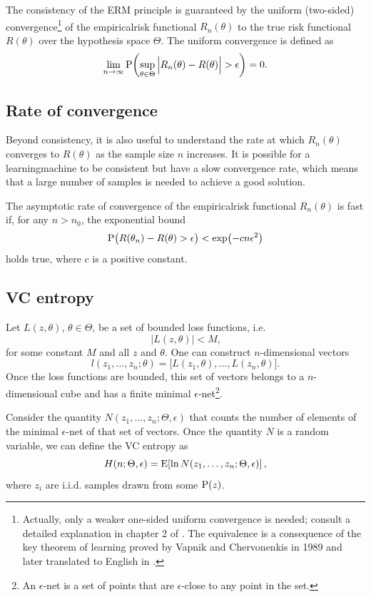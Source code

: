 The consistency of the ERM principle is guaranteed by the uniform (two-sided)
convergence\footnote{Actually, only a weaker one-sided uniform convergence is needed; consult a
detailed explanation in chapter 2 of .  The equivalence is a
consequence of the key theorem of learning proved by Vapnik and Chervonenkis in 1989 and
later translated to English in .} of the \gls{empiricalrisk} functional
$R_n(\theta)$ to the true risk functional $R(\theta)$ over the hypothesis space $\Theta$.
The uniform convergence is defined as
\[
  \lim_{n \to \infty} \operatorname{P}\!\left(
    \sup_{\theta \in \Theta} \Big| R_n(\theta) - R(\theta) \Big| > \epsilon
  \right) = 0\text{.}
\]

\subsection{Rate of convergence}

Beyond consistency, it is also useful to understand the rate at which $R_n(\theta)$
converges to $R(\theta)$ as the sample size $n$ increases.  It is possible for a \gls{learningmachine}
to be consistent but have a slow convergence rate, which means that a large number of
samples is needed to achieve a good solution.

The asymptotic rate of convergence of the \gls{empiricalrisk} functional $R_n(\theta)$ is
fast if, for any $n > n_0$, the exponential bound
\[
  \operatorname{P}\!\big(R(\theta_n) - R(\theta) > \epsilon\big) < \exp\!\left( - c n \epsilon^2 \right)
\]
holds true, where $c$ is a positive constant.

\subsection{VC entropy}

Let $L(z, \theta)$, $\theta \in \Theta$, be a set of bounded \gls{loss} functions, i.e.
\[
  \left| L(z, \theta) \right| < M\text{,}
\]
for some constant $M$ and all $z$ and $\theta$.  One can construct $n$-dimensional vectors
\[
  l(z_1, \dots, z_n; \theta) = \big[ L(z_1, \theta), \dots, L(z_n, \theta) \big]\text{.}
\]
Once the \gls{loss} functions are bounded, this set of vectors belongs to a $n$-dimensional
cube and has a finite minimal $\epsilon$-net\footnote{An $\epsilon$-net is a set of points
that are $\epsilon$-close to any point in the set.}.

Consider the quantity $N(z_1, \dots, z_n; \Theta, \epsilon)$ that counts the number of
elements of the minimal $\epsilon$-net of that set of vectors.
Once the quantity $N$ is a random variable, we can define the VC entropy as
\[
  H(n; \Theta, \epsilon) = \operatorname{E}\!\left[ \ln N(z_1, \dots, z_n; \Theta, \epsilon) \right]\text{,}
\]
where $z_i$ are i.i.d. samples drawn from some $\operatorname{P}(z)$.

